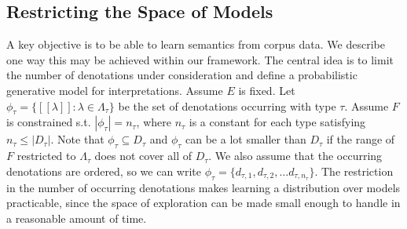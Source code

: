 \documentclass[a4paper,11pt]{article}
\theoremstyle{definition}
\newcommand{\interp}[1]{[\![ #1 ]\!]}
\begin{document}


 
\subsection{Restricting the Space of Models}
\label{section:distributions}

A key objective is to be able to learn semantics from corpus data.  We describe one way this may be achieved within our
framework. The central idea is to limit the number of denotations
under consideration and define a probabilistic generative model for
interpretations. Assume $E$ is fixed. Let
$\phi_\tau = \{\interp{\lambda} : \lambda\in \Lambda_\tau\}$ be the
set of denotations occurring with type $\tau$. Assume $F$ is
constrained s.t. $|\phi_\tau| = n_\tau$, where $n_\tau$ is a
constant for each type satisfying $n_\tau \le |D_\tau|$. Note that
$\phi_\tau \subseteq D_\tau$ and $\phi_\tau$ can be a lot smaller
than $D_\tau$ if the range of $F$ restricted to $\Lambda_\tau$ does
not cover all of $D_\tau$.  We also assume that the occurring
denotations are ordered, so we can write $\phi_\tau =
\{d_{\tau,1}, d_{\tau,2}, \ldots d_{\tau, n_\tau}\}$.
The restriction in the number of occurring denotations makes learning
a distribution over models practicable, since the space of exploration
can be made small enough to handle in a reasonable amount of time.
\end{document}
